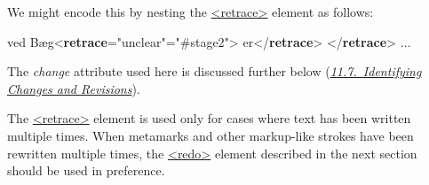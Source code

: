  We might encode this by nesting the \hyperref[TEI.retrace]{<retrace>} element as follows: \par\bgroup{}\exampleFont \begin{shaded}\noindent\mbox{} ved Bæg{<\textbf{retrace}\hspace*{1em}{cause}="{unclear}"\hspace*{1em}{change}="{\#stage2}">}\mbox{}\newline 
{}er{</\textbf{retrace}>}\mbox{}\newline 
{</\textbf{retrace}>} ...\mbox{}\newline 
\end{shaded}\egroup\par \noindent  The {\itshape change} attribute used here is discussed further below (\textit{\hyperref[PH-changes]{11.7.\ Identifying Changes and Revisions}}).\par
The \hyperref[TEI.retrace]{<retrace>} element is used only for cases where text has been written multiple times. When metamarks and other markup-like strokes have been rewritten multiple times, the \hyperref[TEI.redo]{<redo>} element described in the next section should be used in preference.
